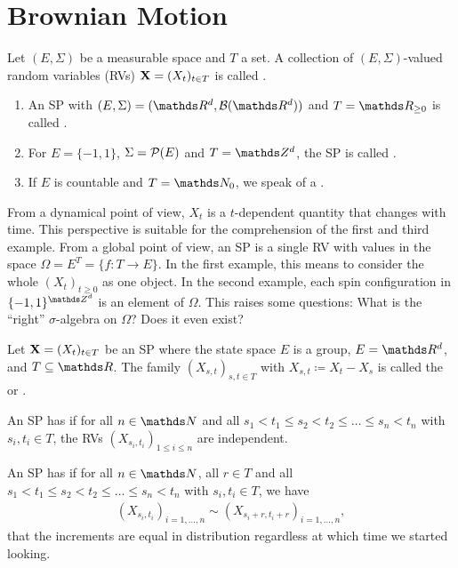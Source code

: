 \chapter{Brownian Motion}
\begin{defi}
Let $(E, \Sigma)$ be a measurable space and $T$ a set.
A collection of $(E, \Sigma)$-valued random variables (RVs)
$\mathbf{X} = (X_t)_{t\in T}$ is called .
\end{defi}

\begin{bsp}
\begin{enumerate}[label=(\alph*)]
\item An SP  with $(E, \Sigma) = (\Rd, \Borel(\Rd))$
	and $T=\R_{\geq 0}$
	is called .
\item For $E = \{-1,1\}$, \(\Sigma = \mathcal{P}(E)\) and $T=\Z^d$,
	the SP is called .
\item If $E$ is countable and $T=\N_0$, we speak of a .
\end{enumerate}
\end{bsp}

From a dynamical point of view,
$X_t$ is a $t$-dependent quantity that changes with time.
This perspective is suitable for the comprehension of the first and third example.
From a global point of view,
an SP is a single RV with values in the space $\Omega=E^T=\{f\colon T\to E\}$.
In the first example,
this means to consider the whole  $(X_t)_{t\geq 0}$ as one object.
In the second example,
each spin configuration in $\{-1,1\}^{\Z^d}$ is an element of $\Omega$.
This raises some questions:
What is the “right” $\sigma$-algebra on \(\Omega\)?
Does it even exist?

\begin{defi}
Let $\mathbf{X} = (X_t)_{t\in T}$ be an SP
where the state space $E$ is a group, \eg $E=\Rd$,
and $T\subseteq \R$.
The family $(X_{s,t})_{s,t\in T}$ with $X_{s,t}\coloneqq X_t-X_s$
is called the  or .

An SP has 
if for all $n\in \N$ and all
$s_1 < t_1 \leq s_2 < t_2 \leq \dots \leq s_n < t_n$
with $s_i, t_i \in T$,
the RVs $(X_{s_i,t_i})_{1\leq i \leq n}$ are independent.

An SP has 
if for all $n\in \N$, all \(r \in T\) and all
$s_1 < t_1 \leq s_2 < t_2 \leq \dots \leq s_n < t_n$
with $s_i,t_i \in T$,
we have
\begin{align*}
(X_{s_i,t_i})_{i=1,\dots,n}\sim  (X_{s_i+r,t_i+r})_{i=1,\dots,n},
\end{align*}
\ie that the increments are equal in distribution
regardless at which time we started looking.
\end{defi}


